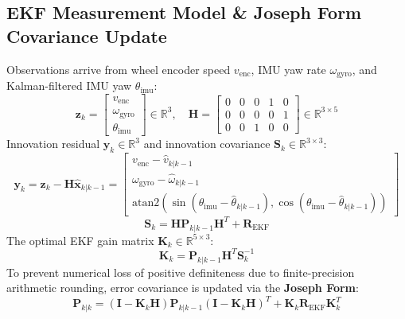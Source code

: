 \documentclass[11pt, a4paper]{article}
\begin{document}
\subsection{EKF Measurement Model \& Joseph Form Covariance Update}
Observations arrive from wheel encoder speed $v_{\text{enc}}$, IMU yaw rate $\omega_{\text{gyro}}$, and Kalman-filtered IMU yaw $\theta_{\text{imu}}$:
\begin{equation}
    \mathbf{z}_k = \begin{bmatrix} v_{\text{enc}} \\ \omega_{\text{gyro}} \\ \theta_{\text{imu}} \end{bmatrix} \in \mathbb{R}^3, \quad 
    \mathbf{H} = \begin{bmatrix} 0 & 0 & 0 & 1 & 0 \\ 0 & 0 & 0 & 0 & 1 \\ 0 & 0 & 1 & 0 & 0 \end{bmatrix} \in \mathbb{R}^{3 \times 5}
\end{equation}
Innovation residual $\mathbf{y}_k \in \mathbb{R}^3$ and innovation covariance $\mathbf{S}_k \in \mathbb{R}^{3 \times 3}$:
\begin{equation}
    \mathbf{y}_k = \mathbf{z}_k - \mathbf{H} \hat{\mathbf{x}}_{k|k-1} = \begin{bmatrix} v_{\text{enc}} - \hat{v}_{k|k-1} \\ \omega_{\text{gyro}} - \hat{\omega}_{k|k-1} \\ \text{atan2}\left(\sin(\theta_{\text{imu}} - \hat{\theta}_{k|k-1}), \cos(\theta_{\text{imu}} - \hat{\theta}_{k|k-1})\right) \end{bmatrix}
\end{equation}
\begin{equation}
    \mathbf{S}_k = \mathbf{H} \mathbf{P}_{k|k-1} \mathbf{H}^T + \mathbf{R}_{\text{EKF}}
\end{equation}
The optimal EKF gain matrix $\mathbf{K}_k \in \mathbb{R}^{5 \times 3}$:
\begin{equation}
    \mathbf{K}_k = \mathbf{P}_{k|k-1} \mathbf{H}^T \mathbf{S}_k^{-1}
\end{equation}
To prevent numerical loss of positive definiteness due to finite-precision arithmetic rounding, error covariance is updated via the \textbf{Joseph Form}:
\begin{equation}
    \mathbf{P}_{k|k} = (\mathbf{I} - \mathbf{K}_k \mathbf{H}) \mathbf{P}_{k|k-1} (\mathbf{I} - \mathbf{K}_k \mathbf{H})^T + \mathbf{K}_k \mathbf{R}_{\text{EKF}} \mathbf{K}_k^T
\end{equation}
\end{document}
